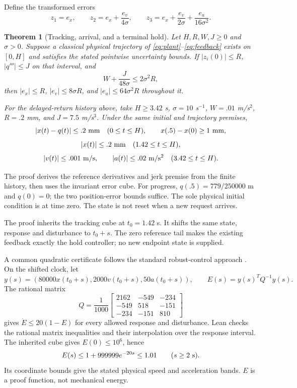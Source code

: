 \documentclass[10pt,letterpaper]{article}
\newtheorem{theorem}{Theorem}
\begin{document}
Define the transformed errors
\[
 z_1=e_x,\qquad z_2=e_x+\frac{e_v}{4\sigma},\qquad
 z_3=e_x+\frac{e_v}{2\sigma}+\frac{e_a}{16\sigma^2}.
\]
\begin{theorem}[Tracking, arrival, and a terminal hold]\label{thm:physical}
Let $H,R,W,J\geq0$ and $\sigma>0$.
Suppose a classical physical trajectory of
\eqref{eq:plant}--\eqref{eq:feedback} exists on $[0,H]$ and satisfies the stated
pointwise uncertainty bounds. If $|z_i(0)|\leq R$, $|q'''|\leq J$ on that interval,
and
\[
 W+\frac{J}{48\sigma}\leq2\sigma^2R,
\]
then $|e_x|\leq R$, $|e_v|\leq8\sigma R$, and $|e_a|\leq64\sigma^2R$ throughout it.

For the delayed-return history above, take $H\geq3.42$ s, $\sigma=10$ s$^{-1}$,
$W=.01$ m/s$^2$, $R=.2$ mm, and $J=7.5$ m/s$^3$. Under the same initial and
trajectory premises,
\[
 |x(t)-q(t)|\leq.2\ {\rm mm}\quad(0\leq t\leq H),
 \qquad x(.5)-x(0)\geq1\ {\rm mm},
\]
\[
 |x(t)|\leq.2\ {\rm mm}\quad(1.42\leq t\leq H),
\]
\[
 |v(t)|\leq.001\ {\rm m/s},\qquad |a(t)|\leq.02\ {\rm m/s^2}
 \quad(3.42\leq t\leq H).
\]
\end{theorem}
The proof derives the reference derivatives and jerk premise from the finite
history, then uses the invariant error cube. For progress,
$q(.5)=779/250000$ m and $q(0)=0$; the two position-error bounds suffice.
The sole physical initial condition is at time zero. The state is not reset
when a new request arrives.

The proof inherits the tracking cube at $t_0=1.42$ s. It shifts the same state,
response and disturbance to $t_0+s$. The zero reference tail makes the existing
feedback exactly the hold controller; no new endpoint state is supplied.

A common quadratic certificate follows the standard robust-control approach
\cite{lmibook}. On the shifted clock, let
\[
 y(s)=(80000x(t_0+s),2000v(t_0+s),50a(t_0+s)),\qquad
 E(s)=y(s)^TQ^{-1}y(s).
\]
The rational matrix
\[
 Q=\frac1{1000}\begin{bmatrix}2162&-549&-234\\-549&518&-151\\-234&-151&810\end{bmatrix}
\]
gives $\dot E\leq20(1-E)$ for every allowed response and disturbance.
Lean checks the rational matrix inequalities and their interpolation over the
response interval. The inherited cube gives $E(0)\leq10^6$, hence
\[
 E(s)\leq1+999999e^{-20s}\leq1.01\qquad(s\geq2\ {\rm s}).
\]
Its coordinate bounds give
the stated physical speed and acceleration bands. $E$ is a proof function,
not mechanical energy.
\end{document}

